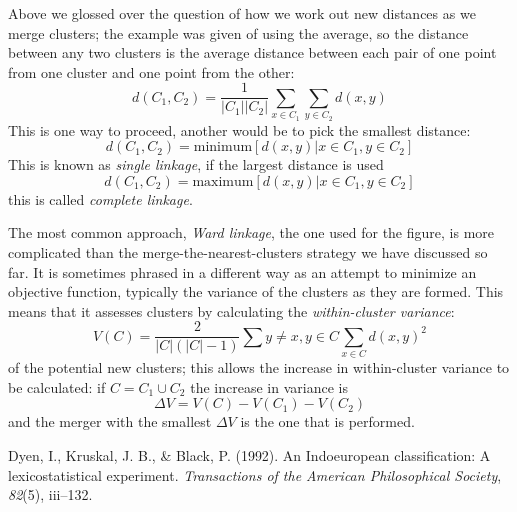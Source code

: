 \documentclass[12pt]{article}
\begin{document}
Above we glossed over the question of how we work out new distances as
we merge clusters; the example was given of using the average, so the
distance between any two clusters is the average distance between each
pair of one point from one cluster and one point from the other:
\begin{equation}
  d(C_1,C_2) = \frac{1}{|C_1||C_2|}\sum_{x\in C_1}\sum_{y\in C_2}d(x,y)
\end{equation}
This is one way to proceed, another would be to pick the smallest distance:
\begin{equation}
d(C_1,C_2)=\text{minimum}[d(x,y)|x\in C_1,y\in C_2]
\end{equation}
This is known as \textsl{single linkage}, if the largest distance is used
\begin{equation}
d(C_1,C_2)=\text{maximum}[d(x,y)|x\in C_1,y\in C_2]
\end{equation}
this is called \textsl{complete linkage}. 

The most common approach, \textsl{Ward linkage}, the one used for the
figure, is more complicated than the merge-the-nearest-clusters
strategy we have discussed so far. It is sometimes phrased in a
different way as an attempt to minimize an objective function,
typically the variance of the clusters as they are formed. This means
that it assesses clusters by calculating the \textsl{within-cluster variance}:
\begin{equation}
  V(C)=\frac{2}{|C|(|C|-1)}\sum{y\not=x,y\in C}\sum_{x\in C} d(x,y)^2
\end{equation}
of the potential new clusters; this allows the increase in
within-cluster variance to be calculated: if $C=C_1\cup C_2$ the increase in variance is
\begin{equation}
  \Delta V=V(C)-V(C_1)-V(C_2)
\end{equation}
and the merger with the smallest $\Delta V$ is the one that is
performed.

\begin{thebibliography}{9}

Dyen, I., Kruskal, J. B., \& Black, P. (1992). An Indoeuropean classification: A lexicostatistical experiment. \textit{Transactions of the American Philosophical Society}, \textit{82}(5), iii--132.

\end{thebibliography}
\end{document}
